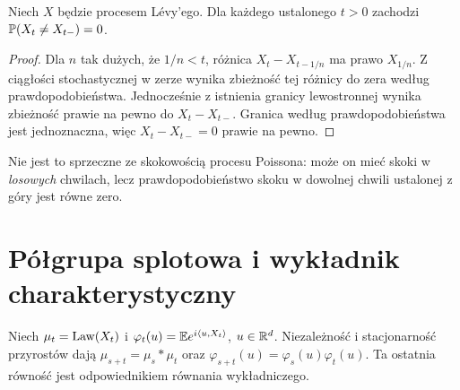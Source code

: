\begin{lemat}
\label{lem:levy-no-fixed-jumps}
Niech $X$ będzie procesem Lévy'ego. Dla każdego ustalonego
$t>0$ zachodzi $\mathbb{P}(X_t\ne X_{t-})=0$.
\end{lemat}
\begin{proof}
Dla $n$ tak dużych, że $1/n<t$, różnica
$X_t-X_{t-1/n}$ ma prawo $X_{1/n}$. Z ciągłości
stochastycznej w zerze wynika zbieżność tej różnicy do
zera według prawdopodobieństwa. Jednocześnie z istnienia
granicy lewostronnej wynika zbieżność prawie na pewno do
$X_t-X_{t-}$. Granica według prawdopodobieństwa jest
jednoznaczna, więc $X_t-X_{t-}=0$ prawie na pewno.
\end{proof}

Nie jest to sprzeczne ze skokowością procesu Poissona:
może on mieć skoki w \emph{losowych} chwilach, lecz
prawdopodobieństwo skoku w dowolnej chwili ustalonej z góry
jest równe zero.

\section{Półgrupa splotowa i wykładnik charakterystyczny}

Niech $\mu_t=\operatorname{Law}(X_t)$ i
$\varphi_t(u)=\mathbb{E} e^{i\langle u,X_t\rangle}$,
$u\in\mathbb{R}^d$. Niezależność i stacjonarność przyrostów dają
$\mu_{s+t}=\mu_s*\mu_t$ oraz
$\varphi_{s+t}(u)=\varphi_s(u)\varphi_t(u)$.
Ta ostatnia równość jest odpowiednikiem równania wykładniczego.

